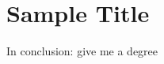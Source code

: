 \documentclass[thesis-main]{subfiles}
\begin{document}
\chapter{Sample Title}

In conclusion: give me a degree
\end{document}
